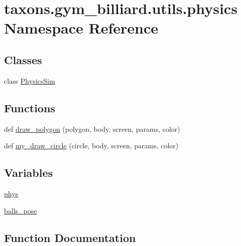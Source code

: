 \hypertarget{namespacetaxons_1_1gym__billiard_1_1utils_1_1physics}{}\section{taxons.\+gym\+\_\+billiard.\+utils.\+physics Namespace Reference}
\label{namespacetaxons_1_1gym__billiard_1_1utils_1_1physics}
\subsection*{Classes}
\begin{DoxyCompactItemize}
\item 
class \hyperlink{classtaxons_1_1gym__billiard_1_1utils_1_1physics_1_1_physics_sim}{Physics\+Sim}
\end{DoxyCompactItemize}
\subsection*{Functions}
\begin{DoxyCompactItemize}
\item 
def \hyperlink{namespacetaxons_1_1gym__billiard_1_1utils_1_1physics_aed0ef0e563f6c1107a6f0068f0d65f81}{draw\+\_\+polygon} (polygon, body, screen, params, color)
\item 
def \hyperlink{namespacetaxons_1_1gym__billiard_1_1utils_1_1physics_afddda5ccf43d12dfcffd39002ee9fdbf}{my\+\_\+draw\+\_\+circle} (circle, body, screen, params, color)
\end{DoxyCompactItemize}
\subsection*{Variables}
\begin{DoxyCompactItemize}
\item 
\hyperlink{namespacetaxons_1_1gym__billiard_1_1utils_1_1physics_a0480b350dea85ca10a6dd983b42b1148}{phys}
\item 
\hyperlink{namespacetaxons_1_1gym__billiard_1_1utils_1_1physics_a8bc2a92fdcd41a3ac33d11920f5871ef}{balls\+\_\+pose}
\end{DoxyCompactItemize}


\subsection{Function Documentation}
